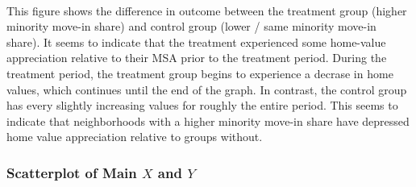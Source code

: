 \documentclass[11pt]{article}
\begin{document}
    \begin{center}
    \end{center}
    { \hspace*{\fill} \\}
    
    This figure shows the difference in outcome between the treatment group (higher minority move-in share) and control group (lower / same minority move-in share). It seems to indicate that the treatment experienced some home-value appreciation relative to their MSA prior to the treatment period. During the treatment period, the treatment group begins to experience a decrase in home values, which continues until the end of the graph. In contrast, the control group has every slightly increasing values for roughly the entire period. This seems to indicate that neighborhoods with a higher minority move-in share have depressed home value appreciation relative to groups without.

    \subsubsection{\texorpdfstring{Scatterplot of Main \(X\) and
\(Y\)}{Scatterplot of Main X and Y}}\label{scatterplot-of-main-x-and-y}
\end{document}
